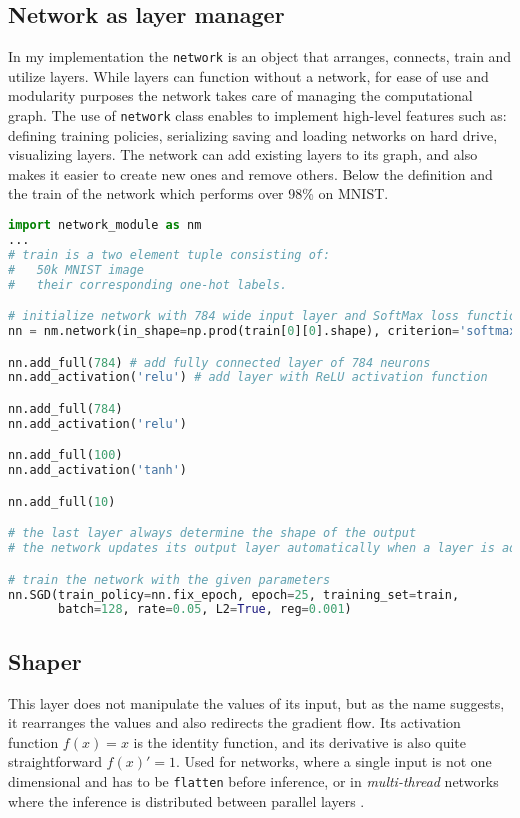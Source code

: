 \subsection{Network as layer manager}
In my implementation the \texttt{network} is an object that arranges, connects, train and utilize layers.
While layers can function without a network, for ease of use and modularity purposes
the network takes care of managing the computational graph.
The use of \texttt{network} class enables to implement high-level features such as:
defining training policies, serializing saving and loading networks on hard drive,
visualizing layers.
The network can add existing layers to its graph, and also makes it easier to create new ones and remove others.
Below the definition and the train of the network which performs over 98\% on MNIST.
\clearpage
\begin{lstlisting}[language=Python]
import network_module as nm
...
# train is a two element tuple consisting of:
#   50k MNIST image 
#   their corresponding one-hot labels.

# initialize network with 784 wide input layer and SoftMax loss function
nn = nm.network(in_shape=np.prod(train[0][0].shape), criterion='softmax') 

nn.add_full(784) # add fully connected layer of 784 neurons
nn.add_activation('relu') # add layer with ReLU activation function

nn.add_full(784)
nn.add_activation('relu')

nn.add_full(100)
nn.add_activation('tanh')

nn.add_full(10) 

# the last layer always determine the shape of the output
# the network updates its output layer automatically when a layer is added

# train the network with the given parameters
nn.SGD(train_policy=nn.fix_epoch, epoch=25, training_set=train,
       batch=128, rate=0.05, L2=True, reg=0.001)
\end{lstlisting}



\subsection{Shaper} This layer does not manipulate the values of its input, but as the name suggests, it rearranges the values and also redirects the gradient flow.
Its activation function $f(x) = x$ is the identity function, and its derivative is also quite straightforward $f(x)'=1$.
Used for networks, where a single input is not one dimensional and has to be \texttt{flatten} before inference, or in \emph{multi-thread} networks where the inference is distributed between parallel layers \cite{szegedy2015going}.

